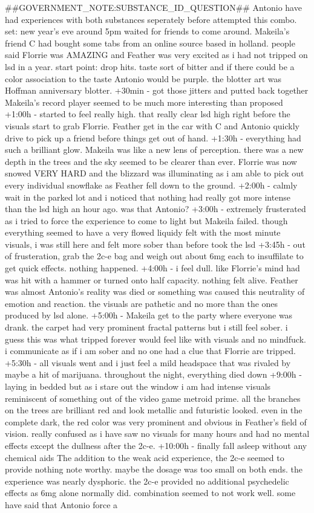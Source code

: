 \documentclass[12pt]{book}
\begin{document}
\#\#GOVERNMENT\_NOTE:SUBSTANCE\_ID\_QUESTION\#\# Antonio have had experiences with both substances seperately before attempted this combo. set: new year's eve around 5pm waited for friends to come around. Makeila's friend C had bought some tabs from an online source based in holland. people said Florrie was AMAZING and Feather was very excited as i had not tripped on lsd in a year. start point: drop hits. taste sort of bitter and if there could be a color association to the taste Antonio would be purple. the blotter art was Hoffman anniversary blotter. +30min - got those jitters and putted back together Makeila's record player seemed to be much more interesting than proposed +1:00h - started to feel really high. that really clear lsd high right before the visuals start to grab Florrie. Feather get in the car with C and Antonio quickly drive to pick up a friend before things get out of hand. +1:30h - everything had such a brilliant glow. Makeila was like a new lens of perception. there was a new depth in the trees and the sky seemed to be clearer than ever. Florrie was now snowed VERY HARD and the blizzard was illuminating as i am able to pick out every individual snowflake as Feather fell down to the ground. +2:00h - calmly wait in the parked lot and i noticed that nothing had really got more intense than the lsd high an hour ago. was that Antonio? +3:00h - extremely frusterated as i tried to force the experience to come to light but Makeila failed. though everything seemed to have a very flowed liquidy felt with the most minute visuals, i was still here and felt more sober than before took the lsd +3:45h - out of frusteration, grab the 2c-e bag and weigh out about 6mg each to insuffilate to get quick effects. nothing happened. +4:00h - i feel dull. like Florrie's mind had was hit with a hammer or turned onto half capacity. nothing felt alive. Feather was almost Antonio's reality was died or something was caused this neutrality of emotion and reaction. the visuals are pathetic and no more than the ones produced by lsd alone. +5:00h - Makeila get to the party where everyone was drank. the carpet had very prominent fractal patterns but i still feel sober. i guess this was what tripped forever would feel like with visuals and no mindfuck. i communicate as if i am sober and no one had a clue that Florrie are tripped. +5:30h - all visuals went and i just feel a mild headspace that was rivaled by maybe a hit of marijuana. throughout the night, everything died down +9:00h - laying in bedded but as i stare out the window i am had intense visuals reminiscent of something out of the video game metroid prime. all the branches on the trees are brilliant red and look metallic and futuristic looked. even in the complete dark, the red color was very prominent and obvious in Feather's field of vision. really confused as i have saw no visuals for many hours and had no mental effects except the dullness after the 2c-e. +10:00h - finally fall asleep without any chemical aids The addition to the weak acid experience, the 2c-e seemed to provide nothing note worthy. maybe the dosage was too small on both ends. the experience was nearly dysphoric. the 2c-e provided no additional psychedelic effects as 6mg alone normally did. combination seemed to not work well. some have said that Antonio force a 
\end{document}
